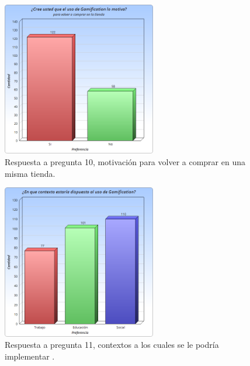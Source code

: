 \begin{figure}[!htb]
  \centering
  \includegraphics[width=0.6\textwidth]{images/Graficos/graf_5_11.png}
  \caption[chart5.11]{Respuesta a pregunta 10, motivación para volver a comprar en una misma tienda.}
  \label{fig:chart5.11}
\end{figure}

\begin{figure}[!htb]
  \centering
  \includegraphics[width=0.6\textwidth]{images/Graficos/graf_5_12.png}
  \caption[chart5.12]{Respuesta a pregunta 11, contextos a los cuales se le podría implementar {\GAM}.}
  \label{fig:chart5.12}
\end{figure}


